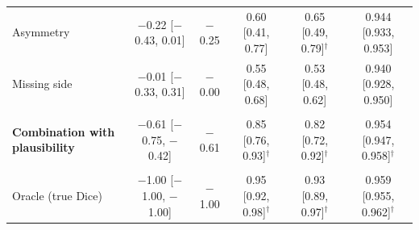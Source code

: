 \begin{table}
\begin{tabular}{lccccc}
\quad Asymmetry & $-$0.22 [$-$0.43, 0.01] & $-$0.25 & 0.60 [0.41, 0.77] & 0.65 [0.49, 0.79]$^\dagger$ & 0.944 [0.933, 0.953] \\
\quad Missing side & $-$0.01 [$-$0.33, 0.31] & $-$0.00 & 0.55 [0.48, 0.68] & 0.53 [0.48, 0.62] & 0.940 [0.928, 0.950] \\
\addlinespace
\multicolumn{6}{l}{\emph{Combination}} \\
\quad \textbf{Combination with plausibility} & $-$0.61 [$-$0.75, $-$0.42] & $-$0.61 & 0.85 [0.76, 0.93]$^\dagger$ & 0.82 [0.72, 0.92]$^\dagger$ & 0.954 [0.947, 0.958]$^\dagger$ \\
\addlinespace
\multicolumn{6}{l}{\emph{Upper bound}} \\
\quad Oracle (true Dice) & $-$1.00 [$-$1.00, $-$1.00] & $-$1.00 & 0.95 [0.92, 0.98]$^\dagger$ & 0.93 [0.89, 0.97]$^\dagger$ & 0.959 [0.955, 0.962]$^\dagger$ \\
\bottomrule
\end{tabular}
\end{table}
